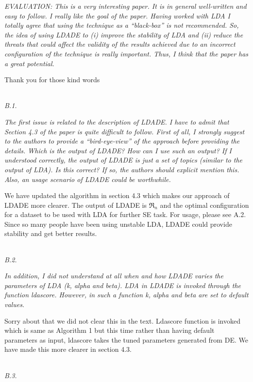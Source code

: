\documentclass[conference]{IEEEtran}
\begin{document}
\textit{EVALUATION: This is a very interesting paper. It is in general well-written and easy to follow. I really like the goal of the paper. Having worked with LDA I totally agree that using the technique as a ``black-box'' is not recommended. So, the idea of using LDADE to (i) improve the stability of LDA and (ii) reduce the threats that could affect the validity of the results achieved due to an incorrect configuration of the technique is really important. Thus, I think that the paper has a great potential.\\} 

Thank you for those kind words

\noindent
\textit{\\B.1.} 

\textit{The first issue is related to the description of LDADE. I have to admit that Section 4.3 of the paper is quite difficult to follow. First of all, I strongly suggest to the authors to provide a ``bird-eye-view'' of the approach before providing the details. Which is the output of LDADE? How can I use such an output? If I understood correctly, the output of LDADE is just a set of topics (similar to the output of LDA). Is this correct? If so, the authors should explicit mention this. Also, an usage scenario of LDADE could be worthwhile.\\}

We have updated the algorithm in section 4.3 which makes our approach of LDADE more clearer. The output of LDADE is $\Re_n$ and the optimal configuration for a dataset to be used with LDA for further SE task. For usage, please see A.2. Since so many people have been using unstable LDA, LDADE could provide stability and get better results.

\noindent
\textit{\\B.2.}  

\textit{In addition, I did not understand at all when and how LDADE varies the parameters of LDA (k, alpha and beta). LDA in LDADE is invoked through the function ldascore. However, in such a function k, alpha and beta are set to default values.\\}

Sorry about that we did not clear this in the text. Ldascore function is invoked which is same as Algorithm 1 but this time rather than having default parameters as input, ldascore takes the tuned parameters generated from DE. We have made this more clearer in section 4.3.

\noindent
\textit{\\B.3.} 
\end{document}
